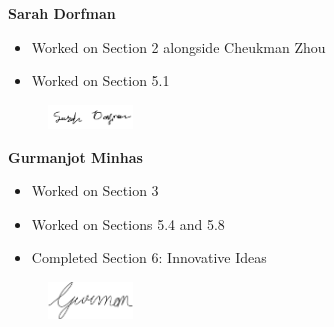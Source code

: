 \textbf{Sarah Dorfman}
\begin{itemize}
    \item Worked on Section 2 alongside Cheukman Zhou
    \item Worked on Section 5.1
\end{itemize}
\begin{figure}[H]
	\centering
	\includegraphics[width=0.2\textwidth]{Signatures/s.png}
\end{figure}

\textbf{Gurmanjot Minhas}
\begin{itemize}
    \item Worked on Section 3
    \item Worked on Sections 5.4 and 5.8
    \item Completed Section 6: Innovative Ideas
\end{itemize}
\begin{figure}[H]
	\centering
	\includegraphics[width=0.2\textwidth]{Signatures/g.png}
\end{figure}

